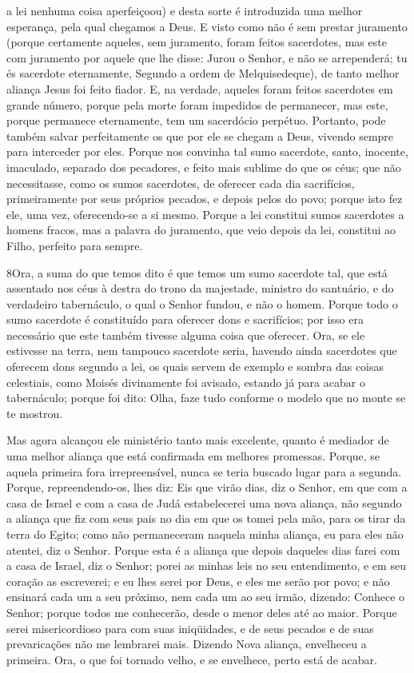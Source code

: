 a lei nenhuma coisa aperfeiçoou) e desta sorte é introduzida
uma melhor esperança, pela qual chegamos a Deus. E visto como
não é sem prestar juramento (porque certamente aqueles, sem
juramento, foram feitos sacerdotes, mas este com juramento
por aquele que lhe disse: Jurou o Senhor, e não se arrependerá; tu
és sacerdote eternamente, Segundo a ordem de Melquisedeque),
de tanto melhor aliança Jesus foi feito fiador. E, na
verdade, aqueles foram feitos sacerdotes em grande número, porque
pela morte foram impedidos de permanecer, mas este, porque
permanece eternamente, tem um sacerdócio perpétuo. Portanto,
pode também salvar perfeitamente os que por ele se chegam a Deus,
vivendo sempre para interceder por eles. Porque nos convinha
tal sumo sacerdote, santo, inocente, imaculado, separado dos
pecadores, e feito mais sublime do que os céus; que não
necessitasse, como os sumos sacerdotes, de oferecer cada dia
sacrifícios, primeiramente por seus próprios pecados, e depois pelos
do povo; porque isto fez ele, uma vez, oferecendo-se a si mesmo.
Porque a lei constitui sumos sacerdotes a homens fracos, mas
a palavra do juramento, que veio depois da lei, constitui ao Filho,
perfeito para sempre.

\medskip

\lettrine{8} Ora, a suma do que temos dito é que temos um sumo
sacerdote tal, que está assentado nos céus à destra do trono da
majestade, ministro do santuário, e do verdadeiro tabernáculo, o
qual o Senhor fundou, e não o homem. Porque todo o sumo
sacerdote é constituído para oferecer dons e sacrifícios; por isso
era necessário que este também tivesse alguma coisa que oferecer.
Ora, se ele estivesse na terra, nem tampouco sacerdote seria,
havendo ainda sacerdotes que oferecem dons segundo a lei, os
quais servem de exemplo e sombra das coisas celestiais, como Moisés
divinamente foi avisado, estando já para acabar o tabernáculo;
porque foi dito: Olha, faze tudo conforme o modelo que no monte se
te mostrou.

Mas agora alcançou ele ministério tanto mais excelente, quanto é
mediador de uma melhor aliança que está confirmada em melhores
promessas. Porque, se aquela primeira fora irrepreensível, nunca
se teria buscado lugar para a segunda. Porque, repreendendo-os,
lhes diz: Eis que virão dias, diz o Senhor, em que com a casa de
Israel e com a casa de Judá estabelecerei uma nova aliança, não
segundo a aliança que fiz com seus pais no dia em que os tomei pela
mão, para os tirar da terra do Egito; como não permaneceram naquela
minha aliança, eu para eles não atentei, diz o Senhor. Porque
esta é a aliança que depois daqueles dias farei com a casa de
Israel, diz o Senhor; porei as minhas leis no seu entendimento, e em
seu coração as escreverei; e eu lhes serei por Deus, e eles me serão
por povo; e não ensinará cada um a seu próximo, nem cada um
ao seu irmão, dizendo: Conhece o Senhor; porque todos me conhecerão,
desde o menor deles até ao maior. Porque serei misericordioso
para com suas iniqüidades, e de seus pecados e de suas prevaricações
não me lembrarei mais. Dizendo Nova aliança, envelheceu a
primeira. Ora, o que foi tornado velho, e se envelhece, perto está
de acabar.

